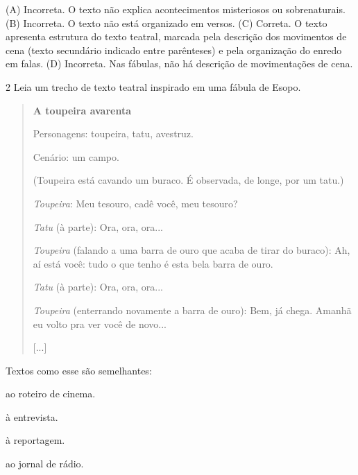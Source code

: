 
(A) Incorreta. O texto não explica acontecimentos misteriosos ou
sobrenaturais.
(B) Incorreta. O texto não está organizado em versos.
(C) Correta. O texto apresenta estrutura do texto teatral, marcada pela
descrição dos movimentos de cena (texto secundário indicado entre
parênteses) e pela organização do enredo em falas.
(D) Incorreta. Nas fábulas, não há descrição de movimentações de cena.

\num{2} Leia um trecho de texto teatral inspirado em uma fábula de Esopo.

\begin{quote}
\textbf{A toupeira avarenta}

Personagens: toupeira, tatu, avestruz.

Cenário: um campo.

(Toupeira está cavando um buraco. É observada, de longe, por um tatu.)

\emph{Toupeira}: Meu tesouro, cadê você, meu tesouro?

\emph{Tatu} (à parte): Ora, ora, ora...

\emph{Toupeira} (falando a uma barra de ouro que acaba de tirar do
buraco): Ah, aí está você: tudo o que tenho é esta bela barra de ouro.

\emph{Tatu} (à parte): Ora, ora, ora...

\emph{Toupeira} (enterrando novamente a barra de ouro): Bem, já chega.
Amanhã eu volto pra ver você de novo...

{[}...{]}

\end{quote}

Textos como esse são semelhantes:

\begin{escolha}
\item ao roteiro de cinema.

\item à entrevista.

\item à reportagem.

\item ao jornal de rádio.
\end{escolha}

